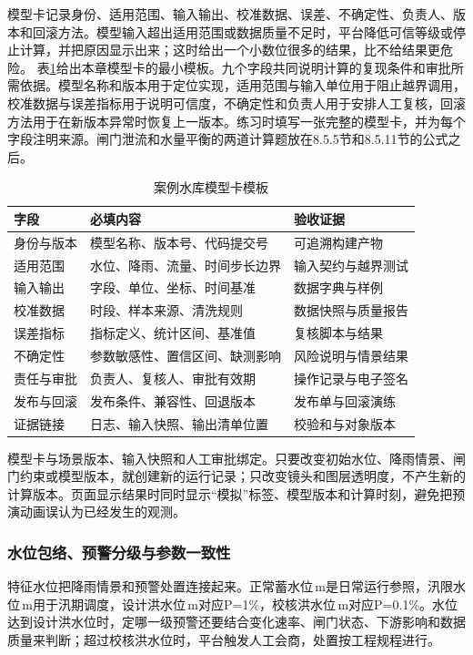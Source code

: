 模型卡记录身份、适用范围、输入输出、校准数据、误差、不确定性、负责人、版本和回滚方法。模型输入超出适用范围或数据质量不足时，平台降低可信等级或停止计算，并把原因显示出来；这时给出一个小数位很多的结果，比不给结果更危险。
表\ref{tab:ch08-model-card-template}给出本章模型卡的最小模板。九个字段共同说明计算的复现条件和审批所需依据。模型名称和版本用于定位实现，适用范围与输入单位用于阻止越界调用，校准数据与误差指标用于说明可信度，不确定性和负责人用于安排人工复核，回滚方法用于在新版本异常时恢复上一版本。练习时填写一张完整的模型卡，并为每个字段注明来源。闸门泄流和水量平衡的两道计算题放在8.5.5节和8.5.11节的公式之后。
\begin{table}[htbp]
\centering
\caption{案例水库模型卡模板}
\label{tab:ch08-model-card-template}
\begin{tabular}{p{2.7cm}p{5.0cm}p{4.5cm}}
\toprule
字段 & 必填内容 & 验收证据 \\
\midrule
身份与版本 & 模型名称、版本号、代码提交号 & 可追溯构建产物 \\
适用范围 & 水位、降雨、流量、时间步长边界 & 输入契约与越界测试 \\
输入输出 & 字段、单位、坐标、时间基准 & 数据字典与样例 \\
校准数据 & 时段、样本来源、清洗规则 & 数据快照与质量报告 \\
误差指标 & 指标定义、统计区间、基准值 & 复核脚本与结果 \\
不确定性 & 参数敏感性、置信区间、缺测影响 & 风险说明与情景结果 \\
责任与审批 & 负责人、复核人、审批有效期 & 操作记录与电子签名 \\
发布与回滚 & 发布条件、兼容性、回退版本 & 发布单与回滚演练 \\
证据链接 & 日志、输入快照、输出清单位置 & 校验和与对象版本 \\
\bottomrule
\end{tabular}
\end{table}

模型卡与场景版本、输入快照和人工审批绑定。只要改变初始水位、降雨情景、闸门约束或模型版本，就创建新的运行记录；只改变镜头和图层透明度，不产生新的计算版本。页面显示结果时同时显示“模拟”标签、模型版本和计算时刻，避免把预演动画误认为已经发生的观测。

\subsubsection{水位包络、预警分级与参数一致性}
特征水位把降雨情景和预警处置连接起来。正常蓄水位\cpNormalLevel\,m是日常运行参照，汛限水位\cpFloodLimitLevel\,m用于汛期调度，设计洪水位\cpDesignFloodLevel\,m对应P=1\%，校核洪水位\cpCheckFloodLevel\,m对应P=0.1\%。水位达到设计洪水位时，定哪一级预警还要结合变化速率、闸门状态、下游影响和数据质量来判断；超过校核洪水位时，平台触发人工会商，处置按工程规程进行。

